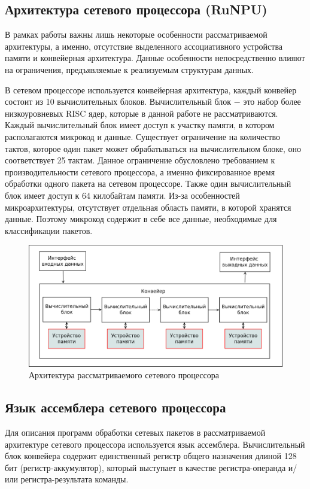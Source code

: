 \documentclass[oneside,final,12pt]{extarticle}
\begin{document}
        \subsection{Архитектура сетевого процессора (RuNPU)}
            \label{sect:arch}
            В рамках работы важны лишь некоторые особенности рассматриваемой архитектуры, а именно, отсутствие выделенного ассоциативного устройства памяти и конвейерная архитектура. 
            Данные особенности непосредственно влияют на ограничения, предъявляемые к реализуемым структурам данных.

            В сетевом процессоре используется конвейерная архитектура, каждый конвейер состоит из 10 вычислительных блоков. 
            Вычислительный блок $-$ это набор более низкоуровневых RISC ядер, которые в данной работе не рассматриваются. 
            Каждый вычислительный блок имеет доступ к участку памяти, в котором располагаются микрокод и данные.
            Существует ограничение на количество тактов, которое один пакет может обрабатываться на вычислительном блоке, оно соответствует 25 тактам.
            Данное ограничение обусловлено требованием к производительности сетевого процессора, а именно фиксированное время обработки одного пакета на сетевом процессоре.
            Также один вычислительный блок имеет доступ к 64 килобайтам памяти.
            Из-за особенностей микроархитектуры, отсутствует отдельная область памяти, в которой хранятся данные. Поэтому микрокод содержит в себе все данные,
            необходимые для классификации пакетов.

            \begin{figure}[h]
                \includegraphics[width=\textwidth]{npu_all.png}
                \caption{Архитектура рассматриваемого сетевого процессора}
            \end{figure}
            
        \subsection{Язык ассемблера сетевого процессора}
            \label{sect:asm}
            Для описания программ обработки сетевых пакетов в рассматриваемой архитектуре сетевого процессора используется язык ассемблера.
            Вычислительный блок конвейера содержит единственный регистр общего назначения длиной 128 бит (регистр-аккумулятор), который выступает в качестве регистра-операнда и/или регистра-результата команды.
\end{document}
